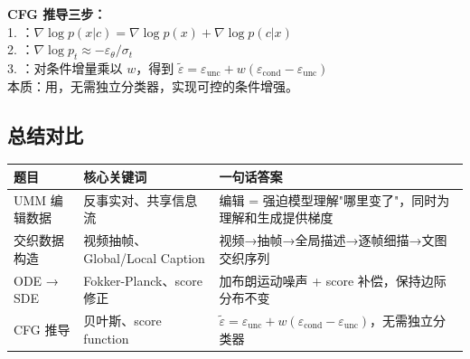 \begin{summarybox}
\textbf{CFG 推导三步：}\\
1. ：$\nabla\log p(x|c) = \nabla\log p(x) + \nabla\log p(c|x)$\\
2. ：$\nabla\log p_t \approx -\varepsilon_\theta / \sigma_t$\\
3. ：对条件增量乘以 $w$，得到 $\tilde{\varepsilon} = \varepsilon_\text{unc} + w(\varepsilon_\text{cond} - \varepsilon_\text{unc})$\\[4pt]
本质：用，无需独立分类器，实现可控的条件增强。
\end{summarybox}

\subsection{总结对比}

\begin{center}
{\small
\begin{tabular}{p{3.5cm}p{4.5cm}p{5.5cm}}
\hline
\textbf{题目} & \textbf{核心关键词} & \textbf{一句话答案} \\
\hline
UMM 编辑数据 & 反事实对、共享信息流 & 编辑 = 强迫模型理解"哪里变了"，同时为理解和生成提供梯度 \\
交织数据构造 & 视频抽帧、Global/Local Caption & 视频→抽帧→全局描述→逐帧细描→文图交织序列 \\
ODE → SDE & Fokker-Planck、score 修正 & 加布朗运动噪声 + score 补偿，保持边际分布不变 \\
CFG 推导 & 贝叶斯、score function & $\tilde\varepsilon = \varepsilon_\text{unc} + w(\varepsilon_\text{cond} - \varepsilon_\text{unc})$，无需独立分类器 \\
\hline
\end{tabular}
}
\end{center}
